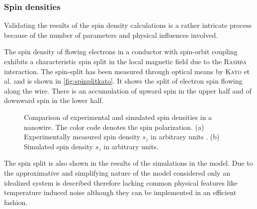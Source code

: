 \subsubsection{Spin densities}
Validating the results of the spin density calculations is a rather intricate process because of the number of parameters and physical influences involved.\par
The spin density of flowing electrons in a conductor with spin-orbit coupling exhibits a characteristic spin split in the local magnetic field due to the \textsc{Rashba} interaction. The spin-split has been measured through optical means by \textsc{Kato} et al. \cite{Kato2004Science} and is shown in \cref{fig:spinplitkato}. It shows the split of electron spin flowing along the wire. There is an accumulation of upward spin in the upper half and of downward spin in the lower half.
\begin{figure}[h]
  \begin{center}
    \qquad
    \qquad
    \caption{Comparison of experimental and simulated spin densities in a nanowire. The color code denotes the spin polarization. (a) Experimentally measured spin density $s_z$ in arbitrary units \cite{Kato2004Science}. (b) Simulated spin density $s_z$ in arbitrary units.}
  \end{center}
\end{figure}
The spin split is also shown in the results of the simulations in the \gfnc{} model. Due to the approximative and simplifying nature of the model considered only an idealized system is described therefore lacking common physical features like temperature induced noise although they can be implemented in an efficient fashion.\par
\FloatBarrier
